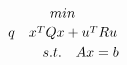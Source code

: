 \documentclass[preview]{standalone}
\begin{document}
\begin{align*}
min \atop q \quad x^TQx + u^T R u \\ s.t. \quad Ax = b
\end{align*}
\end{document}
